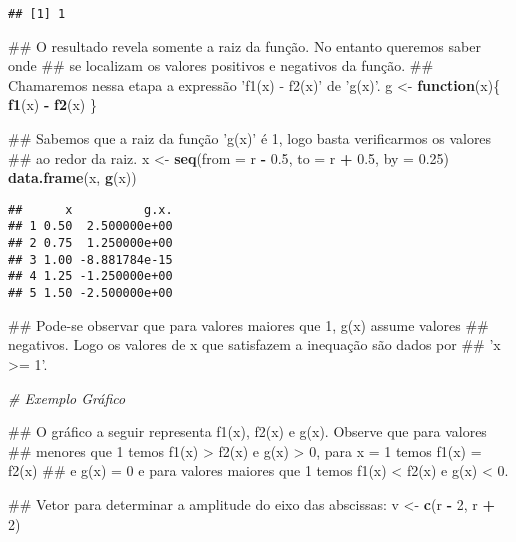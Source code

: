 \documentclass[]{book}
\newenvironment{Shaded}{\begin{snugshade}}{\end{snugshade}}
\newcommand{\KeywordTok}[1]{\textcolor[rgb]{0.13,0.29,0.53}{\textbf{#1}}}
\newcommand{\DataTypeTok}[1]{\textcolor[rgb]{0.13,0.29,0.53}{#1}}
\newcommand{\DecValTok}[1]{\textcolor[rgb]{0.00,0.00,0.81}{#1}}
\newcommand{\FloatTok}[1]{\textcolor[rgb]{0.00,0.00,0.81}{#1}}
\newcommand{\StringTok}[1]{\textcolor[rgb]{0.31,0.60,0.02}{#1}}
\newcommand{\CommentTok}[1]{\textcolor[rgb]{0.56,0.35,0.01}{\textit{#1}}}
\newcommand{\ControlFlowTok}[1]{\textcolor[rgb]{0.13,0.29,0.53}{\textbf{#1}}}
\newcommand{\OperatorTok}[1]{\textcolor[rgb]{0.81,0.36,0.00}{\textbf{#1}}}
\newcommand{\NormalTok}[1]{#1}
\begin{document}
\begin{enumerate}
\begin{verbatim}
## [1] 1
\end{verbatim}

\begin{Shaded}
\begin{Highlighting}[]
\NormalTok{##  O resultado revela somente a raiz da função. No entanto queremos saber onde}
\NormalTok{## se localizam os valores positivos e negativos da função.}
\NormalTok{##  Chamaremos nessa etapa a expressão 'f1(x) - f2(x)' de 'g(x)'.}
\NormalTok{g <-}\StringTok{ }\ControlFlowTok{function}\NormalTok{(x)\{}
  \KeywordTok{f1}\NormalTok{(x) }\OperatorTok{-}\StringTok{ }\KeywordTok{f2}\NormalTok{(x)}
\NormalTok{\}}

\NormalTok{##  Sabemos que a raiz da função 'g(x)' é 1, logo basta verificarmos os valores}
\NormalTok{## ao redor da raiz.}
\NormalTok{x <-}\StringTok{ }\KeywordTok{seq}\NormalTok{(}\DataTypeTok{from =}\NormalTok{ r }\OperatorTok{-}\StringTok{ }\FloatTok{0.5}\NormalTok{, }\DataTypeTok{to =}\NormalTok{ r }\OperatorTok{+}\StringTok{ }\FloatTok{0.5}\NormalTok{, }\DataTypeTok{by =} \FloatTok{0.25}\NormalTok{)}
\KeywordTok{data.frame}\NormalTok{(x, }\KeywordTok{g}\NormalTok{(x))}
\end{Highlighting}
\end{Shaded}

\begin{verbatim}
##      x          g.x.
## 1 0.50  2.500000e+00
## 2 0.75  1.250000e+00
## 3 1.00 -8.881784e-15
## 4 1.25 -1.250000e+00
## 5 1.50 -2.500000e+00
\end{verbatim}

\begin{Shaded}
\begin{Highlighting}[]
\NormalTok{##  Pode-se observar que para valores maiores que 1, g(x) assume valores}
\NormalTok{## negativos. Logo os valores de x que satisfazem a inequação são dados por}
\NormalTok{## 'x >= 1'.}

\CommentTok{# Exemplo Gráfico}

\NormalTok{##  O gráfico a seguir representa f1(x), f2(x) e g(x). Observe que para valores}
\NormalTok{## menores que 1 temos f1(x) > f2(x) e g(x) > 0, para x = 1 temos f1(x) = f2(x)}
\NormalTok{## e g(x) = 0 e para valores maiores que 1 temos f1(x) < f2(x) e g(x) < 0.}

\NormalTok{##  Vetor para determinar a amplitude do eixo das abscissas:}
\NormalTok{v <-}\StringTok{ }\KeywordTok{c}\NormalTok{(r }\OperatorTok{-}\StringTok{ }\DecValTok{2}\NormalTok{, r }\OperatorTok{+}\StringTok{ }\DecValTok{2}\NormalTok{)}


\end{Highlighting}
\end{Shaded}
\end{enumerate}
\end{document}
